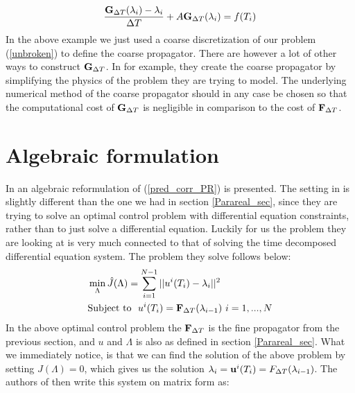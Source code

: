 \begin{align}
\frac{\bold{G}_{\Delta T}(\lambda_i) -\lambda_i }{\Delta T } + A \bold{G}_{\Delta T}(\lambda_i) = f(T_{i}) \label{G_Backward}
\end{align}
In the above example we just used a coarse discretization of our problem (\ref{unbroken}) to define the coarse propagator. There are however a lot of other ways to construct $\bold{G}_{\Delta T}$. In \cite{baffico2002parallel} for example, they create the coarse propagator by simplifying the physics of the problem they are trying to model. The underlying numerical method of the coarse propagator should in any case be chosen so that the computational cost of $\bold{G}_{\Delta T}$ is negligible in comparison to the cost of  $\bold{F}_{\Delta T}$.
\section{Algebraic formulation}\label{algebraic_sec}
In \cite{maday2002parareal} an algebraic reformulation of (\ref{pred_corr_PR}) is presented. The setting in \cite{maday2002parareal} is slightly different than the one we had in section \ref{Parareal_sec}, since they are trying to solve an optimal control problem with differential equation constraints, rather than to just solve a differential equation. Luckily for us the problem they are looking at is very much connected to that of solving the time decomposed differential equation system. The problem they solve follows below:
\begin{align*}
&\min_{\Lambda}\hat{J}(\Lambda) = \sum_{i=1}^{N-1} ||u^{i}(T_{i})-\lambda_{i}||^2 \\
&\textrm{Subject to } \ u^{i}(T_{i}) = \bold F_{\Delta T}(\lambda_{i-1}) \ i=1,...,N
\end{align*}
In the above optimal control problem the $\bold F_{\Delta T}$ is the fine propagator from the previous section, and $u$ and $\Lambda$ is also as defined in section \ref{Parareal_sec}. What we immediately notice, is that we can find the solution of the above problem by setting $J(\Lambda)=0$, which gives us the solution $\lambda_{i}=\bold  u^{i}(T_{i})=F_{\Delta T}(\lambda_{i-1})$. The authors of \cite{maday2002parareal} then write this system on matrix form as:
